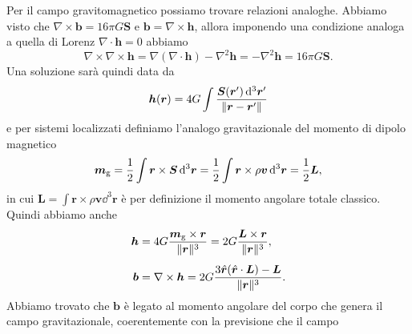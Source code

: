 Per il campo gravitomagnetico possiamo trovare relazioni analoghe.  Abbiamo
visto che $\nabla \times \bm{b} = 16 \pi G \bm{S}$ e
$\bm{b} = \nabla \times \bm{h}$, allora imponendo una condizione analoga a
quella di Lorenz $\nabla \cdot \bm{h} = 0$ abbiamo
\begin{equation}
  \nabla \times \nabla \times \bm{h} = \nabla (\nabla \cdot \bm{h}) - \nabla^{2}
  \bm{h} = - \nabla^{2} \bm{h} = 16\pi G \bm{S}.
\end{equation}
Una soluzione sarà quindi data da
\begin{equation}
  \bm{h}(\bm{r}) = 4 G \int \frac{\bm{S}(\bm{r}') \mathop{}\!\mathrm{d}^{3} \bm{r}'}{\lVert\bm{r}
      - \bm{r}'\rVert}
\end{equation}
e per sistemi localizzati definiamo l'analogo gravitazionale del momento di
dipolo magnetico
\begin{equation}
  \bm{m}_{\textup{g}} = \frac{1}{2} \int \bm{r} \times \bm{S} \mathop{}\!\mathrm{d}^{3} \bm{r} =
  \frac{1}{2} \int \bm{r} \times \rho \bm{v} \mathop{}\!\mathrm{d}^{3} \bm{r} = \frac{1}{2} \bm{L},
\end{equation}
in cui $\bm{L} = \int \bm{r} \times \rho \bm{v} \dd^{3} \bm{r}$ è per
definizione il momento angolare totale classico.  Quindi abbiamo anche
\begin{subequations}
  \begin{align}
    \bm{h} &= 4G \frac{\bm{m}_{\textup{g}} \times \bm{r}}{\lVert\bm{r}\rVert^{3}} =
    2G \frac{\bm{L} \times \bm{r}}{\lVert\bm{r}\rVert^{3}}, \\[1ex]
    \bm{b} &= \nabla \times \bm{h} = 2G\frac{3\hat{\bm{r}}(\hat{\bm{r}} \cdot
      \bm{L}) - \bm{L}}{\lVert\bm{r}\rVert^{3}}.
  \end{align}
\end{subequations}
Abbiamo trovato che $\bm{b}$ è legato al momento angolare del corpo che genera
il campo gravitazionale, coerentemente con la previsione che il campo
